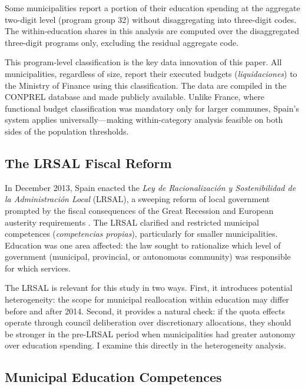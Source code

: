 \documentclass[12pt]{article}
\begin{document}
Some municipalities report a portion of their education spending at the aggregate two-digit level (program group 32) without disaggregating into three-digit codes. The within-education shares in this analysis are computed over the disaggregated three-digit programs only, excluding the residual aggregate code.

This program-level classification is the key data innovation of this paper. All municipalities, regardless of size, report their executed budgets (\emph{liquidaciones}) to the Ministry of Finance using this classification. The data are compiled in the CONPREL database and made publicly available. Unlike France, where functional budget classification was mandatory only for larger communes, Spain's system applies universally---making within-category analysis feasible on both sides of the population thresholds.

\subsection{The LRSAL Fiscal Reform}

In December 2013, Spain enacted the \emph{Ley de Racionalizaci\'{o}n y Sostenibilidad de la Administraci\'{o}n Local} (LRSAL), a sweeping reform of local government prompted by the fiscal consequences of the Great Recession and European austerity requirements \citep{lrsal2013}. The LRSAL clarified and restricted municipal competences (\emph{competencias propias}), particularly for smaller municipalities. Education was one area affected: the law sought to rationalize which level of government (municipal, provincial, or autonomous community) was responsible for which services.

The LRSAL is relevant for this study in two ways. First, it introduces potential heterogeneity: the scope for municipal reallocation within education may differ before and after 2014. Second, it provides a natural check: if the quota effects operate through council deliberation over discretionary allocations, they should be stronger in the pre-LRSAL period when municipalities had greater autonomy over education spending. I examine this directly in the heterogeneity analysis.

\subsection{Municipal Education Competences}
\end{document}
